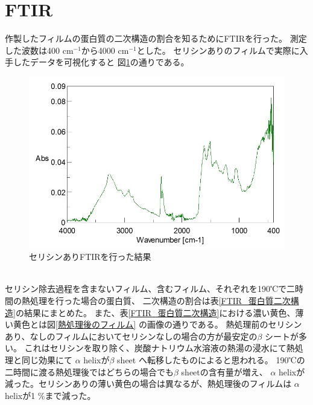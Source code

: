 \documentclass[dvipdfmx,12pt,a4paper]{jreport}
\begin{document}
			\section{FTIR}
			作製したフィルムの蛋白質の二次構造の割合を知るためにFTIRを行った。
			測定した波数は400 cm$^{-1}$から4000 cm$^{-1}$とした。
			セリシンありのフィルムで実際に入手したデータを可視化すると
			図\ref{FTIR_セリシンあり}の通りである。
			\begin{figure}[h]
				\centering
				\includegraphics[scale=0.6]{FTIR_セリシンあり.jpg}
				\caption{セリシンありFTIRを行った結果}
				\label{FTIR_セリシンあり}
			\end{figure}
			\\
			セリシン除去過程を含まないフィルム、含むフィルム、それぞれを190℃で二時間の熱処理を行った場合の蛋白質、
			二次構造の割合は表\ref{FTIR_蛋白質二次構造}の結果にまとめた。
			また、表\ref{FTIR_蛋白質二次構造}における濃い黄色、薄い黄色とは図\ref{熱処理後のフィルム}
			の画像の通りである。
			熱処理前のセリシンあり、なしのフィルムにおいてセリシンなしの場合の方が最安定の$\beta$ シートが多い。
			これはセリシンを取り除く、炭酸ナトリウム水溶液の熱湯の浸水にて熱処理と同じ効果にて
			$\alpha$ helixが$\beta$ sheet へ転移したものによると思われる。
			190℃の二時間に渡る熱処理後ではどちらの場合でも$\beta$ sheetの含有量が増え、
			$\alpha$ helixが減った。セリシンありの薄い黄色の場合は異なるが、熱処理後のフィルムは
			$\alpha$ helixが1 \%まで減った。
\end{document}

